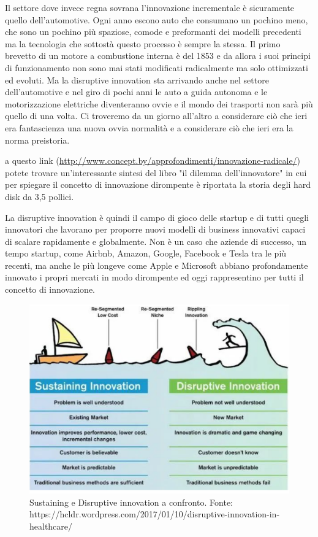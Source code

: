 Il settore dove invece regna sovrana l'innovazione incrementale è sicuramente quello dell'automotive. Ogni anno escono auto che consumano un pochino meno, che sono un pochino più spaziose, comode e preformanti dei modelli precedenti ma la tecnologia che sottostà questo processo è sempre la stessa. Il primo brevetto di un motore a combustione interna è del 1853 e da allora i suoi principi di funzionamento non sono mai stati modificati radicalmente ma solo ottimizzati ed evoluti.
Ma la disruptive innovation sta arrivando anche nel settore dell'automotive e nel giro di pochi anni le auto a guida autonoma e le motorizzazione elettriche diventeranno ovvie e il mondo dei trasporti non sarà più quello di una volta. Ci troveremo da un giorno all'altro a considerare ciò che ieri era fantascienza una nuova ovvia normalità e a considerare ciò che ieri era la norma preistoria.

a questo link (\url{http://www.concept.by/approfondimenti/innovazione-radicale/}) potete trovare un'interessante sintesi del libro "il dilemma dell'innovatore" in cui per spiegare il concetto di innovazione dirompente è  riportata la storia degli hard disk da 3,5 pollici.

La disruptive innovation è quindi il campo di gioco delle startup e di tutti quegli innovatori che lavorano per proporre nuovi modelli di business innovativi capaci di scalare rapidamente e globalmente. Non è un caso che aziende di successo, un tempo startup, come Airbnb, Amazon, Google, Facebook e Tesla tra le più recenti, ma anche le più longeve come Apple e Microsoft abbiano profondamente innovato i propri mercati in modo dirompente ed oggi rappresentino per tutti il concetto di innovazione. 

\begin{figure}[!h]
	\centering
	\includegraphics[width=\textwidth]{"../immagini/Disruptive Innovation"}
		\caption{Sustaining e Disruptive innovation a confronto. Fonte: https://hcldr.wordpress.com/2017/01/10/disruptive-innovation-in-healthcare/}
\end{figure}

